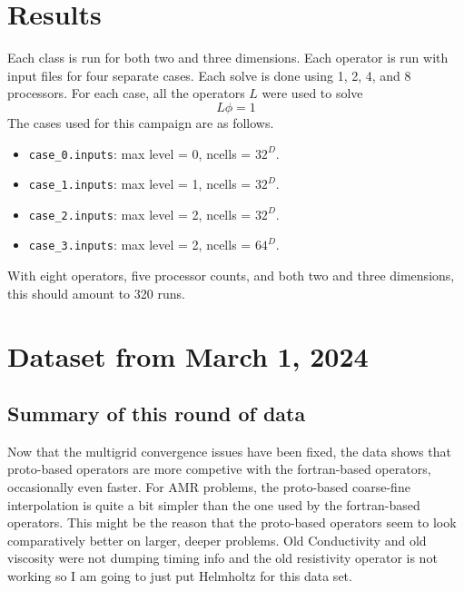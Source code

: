 \documentclass{article}
\begin{document}
 \section{Results}
 
 Each class is run for both two and three dimensions.   Each operator
 is run with input files for  four separate cases.    Each solve is
 done using 1, 2, 4, and 8 processors.
 For each case, all the operators $L$ were used to solve
$$
L\phi = 1
$$
The cases used for this campaign are as follows.
 \begin{itemize}
   \item {\tt case\_0.inputs}: max level = 0, ncells = $32^D$.
   \item {\tt case\_1.inputs}: max level = 1, ncells = $32^D$.
   \item {\tt case\_2.inputs}: max level = 2, ncells = $32^D$.
   \item {\tt case\_3.inputs}: max level = 2, ncells = $64^D$.
 \end{itemize}
 With eight operators, five processor counts,
 and both two and three dimensions,
 this should amount to 320 runs.    
\section{Dataset from March 1, 2024}
 
\subsection{Summary of this round of data}
Now that the multigrid convergence issues have been fixed, the data
shows that proto-based operators are more competive with the
fortran-based operators, occasionally even faster.  For AMR problems,
the proto-based coarse-fine interpolation is quite a bit simpler than
the one used by the fortran-based operators.  This might be the reason
that the proto-based operators seem to look comparatively better on
larger, deeper problems.   Old Conductivity and old viscosity were not dumping timing
info and the old resistivity operator is not working so I am going to
just put Helmholtz for this data set.
\end{document}
